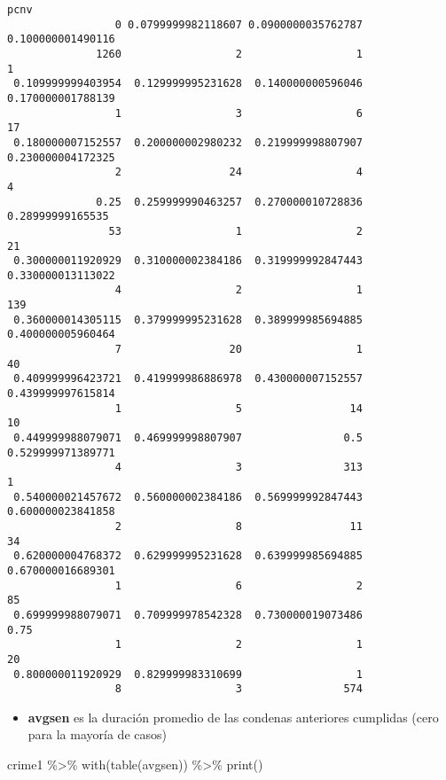 \documentclass[
  letterpaper,
  DIV=11,
  numbers=noendperiod]{scrreprt}
\newenvironment{Shaded}{\begin{snugshade}}{\end{snugshade}}
\newcommand{\FunctionTok}[1]{\textcolor[rgb]{0.28,0.35,0.67}{#1}}
\newcommand{\NormalTok}[1]{\textcolor[rgb]{0.00,0.23,0.31}{#1}}
\newcommand{\SpecialCharTok}[1]{\textcolor[rgb]{0.37,0.37,0.37}{#1}}
\providecommand{\tightlist}{%
  \setlength{\itemsep}{0pt}\setlength{\parskip}{0pt}}\usepackage{longtable,booktabs,array}
\begin{document}
\begin{verbatim}
pcnv
                 0 0.0799999982118607 0.0900000035762787  0.100000001490116 
              1260                  2                  1                  1 
 0.109999999403954  0.129999995231628  0.140000000596046  0.170000001788139 
                 1                  3                  6                 17 
 0.180000007152557  0.200000002980232  0.219999998807907  0.230000004172325 
                 2                 24                  4                  4 
              0.25  0.259999990463257  0.270000010728836   0.28999999165535 
                53                  1                  2                 21 
 0.300000011920929  0.310000002384186  0.319999992847443  0.330000013113022 
                 4                  2                  1                139 
 0.360000014305115  0.379999995231628  0.389999985694885  0.400000005960464 
                 7                 20                  1                 40 
 0.409999996423721  0.419999986886978  0.430000007152557  0.439999997615814 
                 1                  5                 14                 10 
 0.449999988079071  0.469999998807907                0.5  0.529999971389771 
                 4                  3                313                  1 
 0.540000021457672  0.560000002384186  0.569999992847443  0.600000023841858 
                 2                  8                 11                 34 
 0.620000004768372  0.629999995231628  0.639999985694885  0.670000016689301 
                 1                  6                  2                 85 
 0.699999988079071  0.709999978542328  0.730000019073486               0.75 
                 1                  2                  1                 20 
 0.800000011920929  0.829999983310699                  1 
                 8                  3                574 
\end{verbatim}

\begin{itemize}
\tightlist
\item
  \textbf{avgsen} es la duración promedio de las condenas anteriores
  cumplidas (cero para la mayoría de casos)
\end{itemize}

\begin{Shaded}
\begin{Highlighting}[]
\NormalTok{crime1 }\SpecialCharTok{\%\textgreater{}\%} 
  \FunctionTok{with}\NormalTok{(}\FunctionTok{table}\NormalTok{(avgsen)) }\SpecialCharTok{\%\textgreater{}\%} 
  \FunctionTok{print}\NormalTok{()}
\end{Highlighting}
\end{Shaded}
\end{document}

